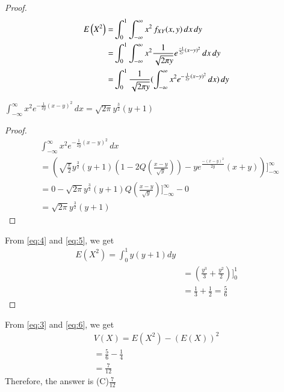 \documentclass[journal,12pt,twocolumn]{IEEEtran}
\begin{document}
\begin{proof}
\begin{align}
 E\left(X^2\right)=&\int_{0}^{1}\int_{-\infty}^{\infty}x^2\,f_{XY}(x, y)\,dx\,dy\\   
 =&\int_{0}^{1}\int_{-\infty}^{\infty}x^2\frac{1}{\sqrt{2\pi y}}e^{\frac{-1}{2y}(x-y)^2}\,dx \,dy\\
 =&\int_{0}^{1}\frac{1}{\sqrt{2\pi y}}(\int_{-\infty}^{\infty}x^2e^{-\frac{1}{2y}(x-y)^2}\,dx)\,dy
 \label{eq:4}
\end{align}
\begin{lemma}
$\int_{-\infty}^{\infty}x^2e^{-\frac{1}{2y}(x-y)^2}\,dx=\sqrt{2\pi}y^\frac{3}{2}(y+1)$
\end{lemma} 
\begin{proof}
\begin{align}
&\int_{-\infty}^{\infty}x^2e^{-\frac{1}{2y}(x-y)^2}\,dx\\
&=(\sqrt{\frac{\pi}{2}}y^\frac{3}{2}(y+1)(1-2Q(\frac{x-y}{\sqrt{y}})) - ye^\frac{-(x-y)^2}{2y}(x+y))]_{-\infty}^{\infty}\\
&=0-\sqrt{2\pi}y^\frac{3}{2}(y+1)Q(\frac{x-y}{\sqrt{y}})]_{-\infty}^{\infty} - 0\\
&=\sqrt{2\pi}y^\frac{3}{2}(y+1) \label{eq:5}
\end{align}
\end{proof}
From \eqref{eq:4} and \eqref{eq:5}, we get
\begin{align}
E(X^2) = \int_{0}^{1}y(y+1)dy\\
&=(\frac{y^3}{3}+\frac{y^2}{2})]_{0}^{1}\\
&=\frac{1}{3}+\frac{1}{2}=\frac{5}{6} \label{eq:6}
\end{align}
\end{proof}
From \eqref{eq:3} and \eqref{eq:6}, we get
\begin{align}
V(X) = E(X^2) - (E(X))^2\\
     = \frac{5}{6} - \frac{1}{4}\\
     = \frac{7}{12}
\end{align}
Therefore, the answer is (C)$\frac{7}{12}$
\end{document}
